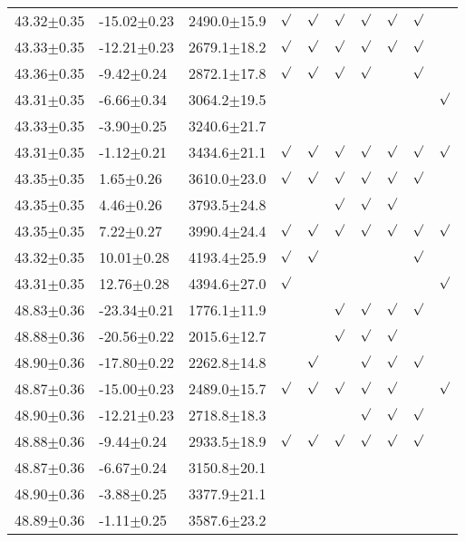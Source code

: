 \begin{table}[h]
\begin{center}
\begin{tabular}{llllllllll}
43.32$\pm$0.35 & -15.02$\pm$0.23 & 2490.0$\pm$15.9& $\surd$ & $\surd$ & $\surd$ & $\surd$ & $\surd$ & $\surd$ & \\
43.33$\pm$0.35 & -12.21$\pm$0.23 & 2679.1$\pm$18.2& $\surd$ & $\surd$ & $\surd$ & $\surd$ & $\surd$ & $\surd$ & \\
43.36$\pm$0.35 & -9.42$\pm$0.24 & 2872.1$\pm$17.8& $\surd$ & $\surd$ & $\surd$ & $\surd$ & & $\surd$ & \\
43.31$\pm$0.35 & -6.66$\pm$0.34 & 3064.2$\pm$19.5& & & & & & & $\surd$ \\
43.33$\pm$0.35 & -3.90$\pm$0.25 & 3240.6$\pm$21.7& & & & & & & \\
43.31$\pm$0.35 & -1.12$\pm$0.21 & 3434.6$\pm$21.1& $\surd$ & $\surd$ & $\surd$ & $\surd$ & $\surd$ & $\surd$ & $\surd$ \\
43.35$\pm$0.35 & 1.65$\pm$0.26 & 3610.0$\pm$23.0& $\surd$ & $\surd$ & $\surd$ & $\surd$ & $\surd$ & $\surd$ & \\
43.35$\pm$0.35 & 4.46$\pm$0.26 & 3793.5$\pm$24.8& & & $\surd$ & $\surd$ & $\surd$ & & \\
43.35$\pm$0.35 & 7.22$\pm$0.27 & 3990.4$\pm$24.4& $\surd$ & $\surd$ & $\surd$ & $\surd$ & $\surd$ & $\surd$ & $\surd$ \\
43.32$\pm$0.35 & 10.01$\pm$0.28 & 4193.4$\pm$25.9& $\surd$ & $\surd$ & & & & $\surd$ & \\
43.31$\pm$0.35 & 12.76$\pm$0.28 & 4394.6$\pm$27.0& $\surd$ & & & & & & $\surd$ \\
48.83$\pm$0.36 & -23.34$\pm$0.21 & 1776.1$\pm$11.9& & & $\surd$ & $\surd$ & $\surd$ & $\surd$ & \\
48.88$\pm$0.36 & -20.56$\pm$0.22 & 2015.6$\pm$12.7& & & $\surd$ & $\surd$ & $\surd$ & & \\
48.90$\pm$0.36 & -17.80$\pm$0.22 & 2262.8$\pm$14.8& & $\surd$ & & $\surd$ & $\surd$ & $\surd$ & \\
48.87$\pm$0.36 & -15.00$\pm$0.23 & 2489.0$\pm$15.7& $\surd$ & $\surd$ & $\surd$ & $\surd$ & $\surd$ & & $\surd$ \\
48.90$\pm$0.36 & -12.21$\pm$0.23 & 2718.8$\pm$18.3& & & & $\surd$ & $\surd$ & $\surd$ & \\
48.88$\pm$0.36 & -9.44$\pm$0.24 & 2933.5$\pm$18.9& $\surd$ & $\surd$ & $\surd$ & $\surd$ & $\surd$ & $\surd$ & \\
48.87$\pm$0.36 & -6.67$\pm$0.24 & 3150.8$\pm$20.1& & & & & & & \\
48.90$\pm$0.36 & -3.88$\pm$0.25 & 3377.9$\pm$21.1& & & & & & & \\
48.89$\pm$0.36 & -1.11$\pm$0.25 & 3587.6$\pm$23.2& & & & & & & \\

\end{tabular}
\end{center}
\end{table}

